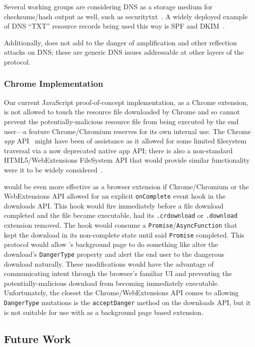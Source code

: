 Several working groups are considering DNS as a storage medium for
checksums/hash output as well, such as securitytxt~\cite{draft-sectxt}. A widely
deployed example of DNS ``TXT'' resource records being used this way is SPF and
DKIM~\cite{DKIM}.

Additionally, \SYSTEM{} does not add to the danger of amplification and other
reflection attacks on DNS; these are generic DNS issues addressable at other
layers of the protocol.

\subsubsection{Chrome Implementation}

Our current JavaScript proof-of-concept implementation, as a Chrome extension,
is not allowed to touch the resource file downloaded by Chrome and so cannot
prevent the potentially-malicious resource file from being executed by the end
user---a feature Chrome/Chromium reserves for its own internal use. The Chrome
\textit{app} API~\cite{AppAPI} might have been of assistance as it allowed for
some limited filesystem traversal via a now deprecated native app API; there is
also a non-standard HTML5/WebExtensions FileSystem API that would provide
similar functionality were it to be widely considered~\cite{deadSpec}.

\SYSTEM{} would be even more effective as a browser extension if Chrome/Chromium
or the WebExtensions API allowed for an explicit \texttt{onComplete} event hook
in the downloads API. This hook would fire immediately before a file download
completed and the file became executable, \ie had its \texttt{.crdownload} or
\texttt{.download} extension removed. The hook would consume a
\texttt{Promise}/\texttt{AsyncFunction} that kept the download in its
non-complete state until said \texttt{Promise} completed. This protocol would allow
\SYSTEM{}'s background page to do something like alter the download's
\texttt{DangerType} property and alert the end user to the dangerous download
naturally. These modifications would have the advantage of communicating intent through the
browser's familiar UI and preventing the potentially-malicious download from
becoming immediately executable. Unfortunately, the closest the
Chrome/WebExtensions API comes to allowing \texttt{DangerType} mutations is the
\texttt{acceptDanger} method on the downloads API, but it is not suitable for
use with \SYSTEM{} as a background page based extension.

\subsection{Future Work}

